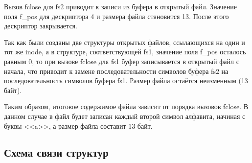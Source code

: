 Вызов fclose для fs2 приводит к записи из буфера в открытый файл. Значение поля f\_pos для дескриптора 4 и размера файла становится 13. После этого дескриптор закрывается.

Так как были созданы две структуры открытых файлов, ссылающихся на один и тот же inode, а в структуре, соответствующей fs1, значение поля f\_pos осталось равным 0, то при вызове fclose для fs1 буфер записывается в открытый файл с начала, что приводит к замене последовательности символов буфера fs2 на последовательность символов буфера fs1. Размер файла остаётся неизменным (13 байт).

Таким образом, итоговое содержимое файла зависит от порядка вызовов fclose. В данном случае в файл будет записан каждый второй символ алфавита, начиная с буквы <<a>>, а размер файла составит 13 байт.

\subsection{Схема связи структур}


